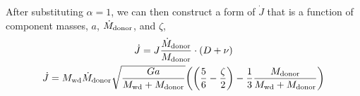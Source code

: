 After substituting $\alpha = 1$, we can then construct a form of $\dot J$ that is a function of component masses, $a$, $\dot M_{\rm donor}$, and $\zeta$,
\begin{gather}
    \dot J = J \frac{\dot M_{\rm donor}}{M_{\rm donor}} \cdot (D + \nu) \\
    \dot J = M_{\rm wd} \dot M_{\rm donor} \sqrt{\frac{G a }{M_{\rm wd} + M_{\rm donor}}} \bigg( \bigg(\frac{5}{6} - \frac{\zeta}{2}\bigg )  - \frac{1}{3} \frac{M_{\rm donor}}{M_{\rm wd} + M_{\rm donor}}\bigg ) \label{eqn:modelling:Jdot from Mdot}
\end{gather}


